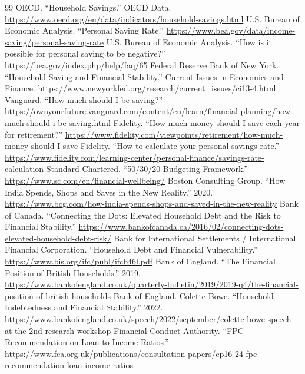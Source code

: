 \documentclass[11pt,a4paper]{article}
\begin{document}
\begin{thebibliography}{99}\small
\setlength{\itemsep}{1pt}
 OECD. ``Household Savings.'' OECD Data. \url{https://www.oecd.org/en/data/indicators/household-savings.html}
 U.S. Bureau of Economic Analysis. ``Personal Saving Rate.'' \url{https://www.bea.gov/data/income-saving/personal-saving-rate}
 U.S. Bureau of Economic Analysis. ``How is it possible for personal saving to be negative?'' \url{https://bea.gov/index.php/help/faq/65}
 Federal Reserve Bank of New York. ``Household Saving and Financial Stability.'' Current Issues in Economics and Finance. \url{https://www.newyorkfed.org/research/current_issues/ci13-4.html}
 Vanguard. ``How much should I be saving?'' \url{https://ownyourfuture.vanguard.com/content/en/learn/financial-planning/how-much-should-i-be-saving.html}
 Fidelity. ``How much money should I save each year for retirement?'' \url{https://www.fidelity.com/viewpoints/retirement/how-much-money-should-I-save}
 Fidelity. ``How to calculate your personal savings rate.'' \url{https://www.fidelity.com/learning-center/personal-finance/savings-rate-calculation}
 Standard Chartered. ``50/30/20 Budgeting Framework.'' \url{https://www.sc.com/en/financial-wellbeing/}
 Boston Consulting Group. ``How India Spends, Shops and Saves in the New Reality.'' 2020. \url{https://www.bcg.com/how-india-spends-shops-and-saved-in-the-new-reality}
 Bank of Canada. ``Connecting the Dots: Elevated Household Debt and the Risk to Financial Stability.'' \url{https://www.bankofcanada.ca/2016/02/connecting-dots-elevated-household-debt-risk/}
 Bank for International Settlements / International Financial Corporation. ``Household Debt and Financial Vulnerability.'' \url{https://www.bis.org/ifc/publ/ifcb46l.pdf}
 Bank of England. ``The Financial Position of British Households.'' 2019. \url{https://www.bankofengland.co.uk/quarterly-bulletin/2019/2019-q4/the-financial-position-of-british-households}
 Bank of England. Colette Bowe. ``Household Indebtedness and Financial Stability.'' 2022. \url{https://www.bankofengland.co.uk/speech/2022/september/colette-bowe-speech-at-the-2nd-research-workshop}
 Financial Conduct Authority. ``FPC Recommendation on Loan-to-Income Ratios.'' \url{https://www.fca.org.uk/publications/consultation-papers/cp16-24-fpc-recommendation-loan-income-ratios}

\end{thebibliography}
\end{document}
